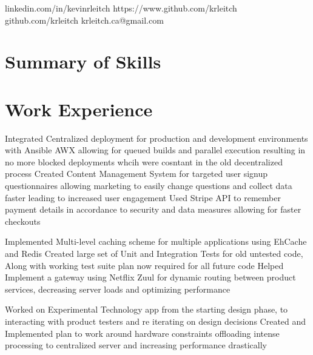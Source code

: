 \documentclass{my_resume}
\begin{document}
        {linkedin.com/in/kevinrleitch}
        {https://www.github.com/krleitch}
        {github.com/krleitch}
        {krleitch.ca@gmail.com}

\section{Summary of Skills}

\section{Work Experience}

\workitemsthree
{Integrated Centralized deployment for production and development environments with Ansible AWX allowing for queued builds
and parallel execution resulting in no more blocked deployments whcih were cosntant in the old decentralized process}
{Created Content Management System for targeted user signup questionnaires allowing marketing to easily change questions and collect data faster leading to increased user engagement}
{Used Stripe API to remember payment details in accordance to security and data measures allowing for faster checkouts}

\workitemsthree
{Implemented Multi-level caching scheme for multiple applications using EhCache and Redis}
{Created large set of Unit and Integration Tests for old untested code, Along with working test suite plan now required for all future code}
{Helped Implement a gateway using Netflix Zuul for dynamic routing between product services, decreasing server loads and optimizing performance}

\workitemstwo
{Worked on Experimental Technology app from the starting design phase, to interacting with product testers and re iterating on design decisions}
{Created and Implemented plan to work around hardware constraints offloading intense processing to centralized server and increasing performance drastically}
\end{document}
